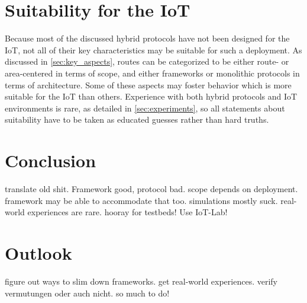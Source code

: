 \documentclass[a4paper,10pt]{scrartcl}
\begin{document}
\section{Suitability for the IoT}
\label{sec:suitability}
Because most of the discussed hybrid protocols have not been designed for the IoT, not all of their key characteristics may be suitable for such a deployment. As discussed in \ref{sec:key_aspects}, routes can be categorized to be either route- or area-centered in terms of scope, and either frameworks or monolithic protocols in terms of architecture. 
Some of these aspects may foster behavior which is more suitable for the IoT than others.
Experience with both hybrid protocols and IoT environments 
is rare, as detailed in \ref{sec:experiments}, so all statements about suitability have to be taken as educated guesses rather than hard truths.


\section{Conclusion}
\label{sec:conclusion}
translate old shit. Framework good, protocol bad. scope depends on deployment. framework may be able to accommodate that too. simulations mostly suck. real-world experiences are rare. hooray for testbeds! Use IoT-Lab!

\section{Outlook}
\label{sec:outlook}
figure out ways to slim down frameworks.
get real-world experiences. verify vermutungen oder auch nicht. so much to do!

\printglossaries

{\small


}
\end{document}
